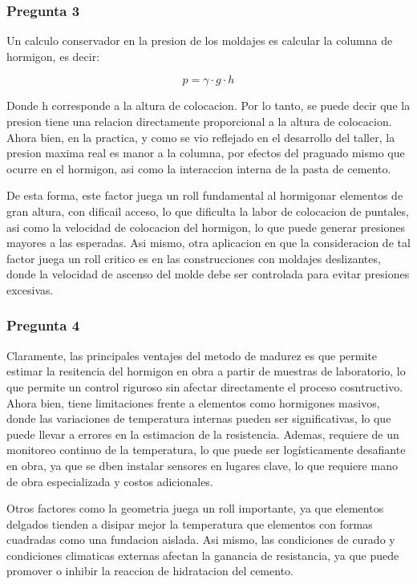 \subsubsection*{Pregunta 3} 

Un calculo conservador en la presion de los moldajes es calcular la columna de hormigon, es decir:

\begin{equation}
    p = \gamma \cdot g \cdot h
\end{equation}

Donde h corresponde a la altura de colocacion. Por lo tanto, se puede decir que la presion tiene una relacion directamente proporcional a la altura de colocacion. Ahora bien, en la practica, y como se vio reflejado en el desarrollo del taller, la presion maxima real es manor a la columna, por efectos del praguado mismo que ocurre en el hormigon, asi como la interaccion interna de la pasta de cemento.

De esta forma, este factor juega un roll fundamental al hormigonar elementos de gran altura, con dificail acceso, lo que dificulta la labor de colocacion de puntales, asi como la velocidad de colocacion del hormigon, lo que puede generar presiones mayores a las esperadas. Asi mismo, otra aplicacion en que la consideracion de tal factor juega un roll critico es en las construcciones con moldajes deslizantes, donde la velocidad de ascenso del molde debe ser controlada para evitar presiones excesivas.

\subsubsection*{Pregunta 4} 

Claramente, las principales ventajes del metodo de madurez es que permite estimar la resitencia del hormigon en obra a partir de muestras de laboratorio, lo que permite un control riguroso sin afectar directamente el proceso cosntructivo. Ahora bien, tiene limitaciones frente a elementos como hormigones masivos, donde las variaciones de temperatura internas pueden ser significativas, lo que puede llevar a errores en la estimacion de la resistencia. Ademas, requiere de un monitoreo continuo de la temperatura, lo que puede ser logísticamente desafiante en obra, ya que se dben instalar sensores en lugares clave, lo que requiere mano de obra especializada y costos adicionales.

Otros factores como la geometria juega un roll importante, ya que elementos delgados tienden a disipar mejor la temperatura que elementos con formas cuadradas como una fundacion aislada. Asi mismo, las condiciones de curado y condiciones climaticas externas afectan la ganancia de resistancia, ya que puede promover o inhibir la reaccion de hidratacion del cemento.


